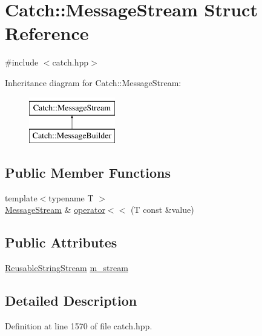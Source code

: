\hypertarget{struct_catch_1_1_message_stream}{}\section{Catch\+:\+:Message\+Stream Struct Reference}
\label{struct_catch_1_1_message_stream}


{\ttfamily \#include $<$catch.\+hpp$>$}

Inheritance diagram for Catch\+:\+:Message\+Stream\+:\begin{figure}[H]
\begin{center}
\leavevmode
\includegraphics[height=2.000000cm]{struct_catch_1_1_message_stream}
\end{center}
\end{figure}
\subsection*{Public Member Functions}
\begin{DoxyCompactItemize}
\item 
{\footnotesize template$<$typename T $>$ }\\\mbox{\hyperlink{struct_catch_1_1_message_stream}{Message\+Stream}} \& \mbox{\hyperlink{struct_catch_1_1_message_stream_a554c4aff5925a077e9fe9d858217428d}{operator$<$$<$}} (T const \&value)
\end{DoxyCompactItemize}
\subsection*{Public Attributes}
\begin{DoxyCompactItemize}
\item 
\mbox{\hyperlink{class_catch_1_1_reusable_string_stream}{Reusable\+String\+Stream}} \mbox{\hyperlink{struct_catch_1_1_message_stream_a9202520faed8882ef469db9f353ec578}{m\+\_\+stream}}
\end{DoxyCompactItemize}


\subsection{Detailed Description}


Definition at line 1570 of file catch.\+hpp.



